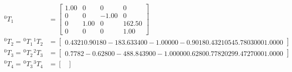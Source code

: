 \begin{equation*}
    \begin{split}
        ^{0}T_{1}                                                 & = \begin{bmatrix}
                                                                          1.00 & 0    & 0     & 0      \\
                                                                          0    & 0    & -1.00 & 0      \\
                                                                          0    & 1.00 & 0     & 162.50 \\
                                                                          0    & 0    & 0     & 1.00
                                                                      \end{bmatrix}   \\
        ^{0}T_{2} = \hspace{1pt} ^{0}T_{1} \hspace{1pt} ^{1}T_{2} & = \begin{bmatrix}
                                                                          0.4321	0.9018	0	-183.6334
                                                                          0	0	-1.0000	0
                                                                          -0.9018	0.4321	0	545.7803
                                                                          0	0	0	1.0000
                                                                      \end{bmatrix}       \\
        ^{0}T_{3} = \hspace{1pt} ^{0}T_{2} \hspace{1pt} ^{2}T_{3} & = \begin{bmatrix}
                                                                          0.7782	-0.6280	0	-488.8439
                                                                          0	0	-1.0000	0
                                                                          0.6280	0.7782	0	299.4727
                                                                          0	0	0	1.0000
                                                                      \end{bmatrix}      \\
        ^{0}T_{4} = \hspace{1pt} ^{0}T_{3} \hspace{1pt} ^{3}T_{4} & = \begin{bmatrix}

\end{bmatrix}
\end{split}
\end{equation*}
